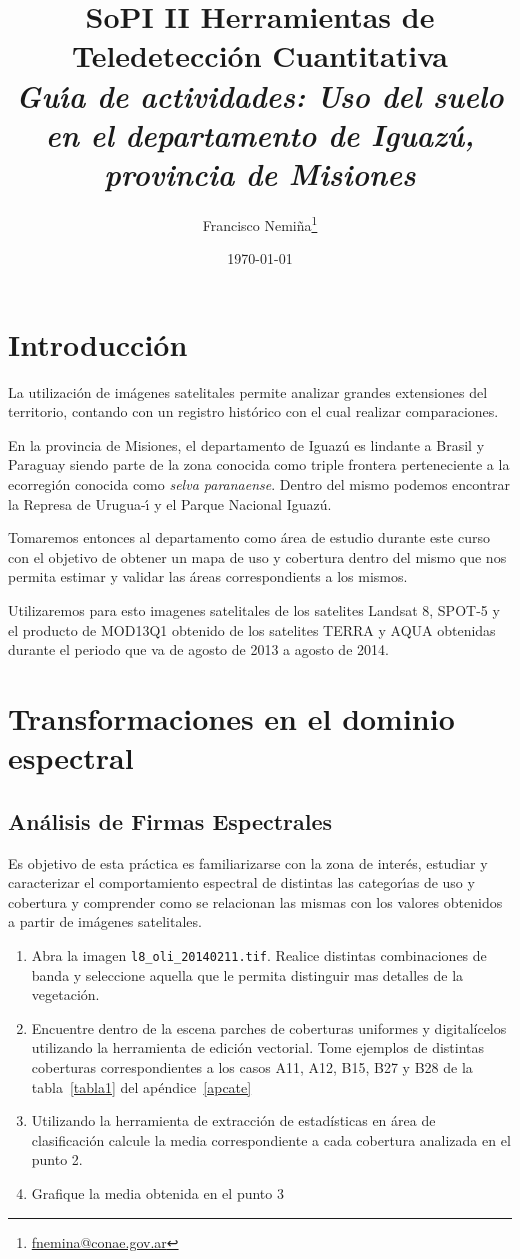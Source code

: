\documentclass[hidelinks,12pt]{article}
\title{SoPI II \- Herramientas de Teledetecci\'on Cuantitativa \\
\emph{Gu\'{\i}a de actividades: Uso del suelo en el departamento de Iguaz\'u,
provincia de Misiones}}
\author{Francisco
Nemi\~na\thanks{\href{mailto:fnemina@conae.govar}{fnemina@conae.gov.ar}}}
\affil{Unidad de Educaci\'on y Formaci\'on Masiva\\
    Comisi\'on Nacional de Actividades Espaciales}
\date{\today}
\begin{document}
\maketitle

\section*{Introducci\'on}

La utilización de imágenes satelitales permite analizar grandes extensiones del
territorio, contando con un registro histórico con el cual realizar
comparaciones.

En la provincia de Misiones, el departamento de Iguaz\'u es lindante a Brasil y
Paraguay siendo parte de la zona conocida como triple frontera
perteneciente a la ecorregi\'on conocida como \emph{selva paranaense}. Dentro
del mismo podemos encontrar la Represa de Urugua-\'{\i} y el Parque Nacional
Iguaz\'u.

Tomaremos entonces al departamento como \'area de estudio durante este curso
con el objetivo de obtener un mapa de uso y cobertura dentro del mismo que nos
permita estimar y validar  las \'areas correspondients a los mismos.

Utilizaremos para esto imagenes satelitales de los satelites Landsat 8, SPOT-5 y
el producto de MOD13Q1 obtenido de los satelites TERRA y AQUA obtenidas durante
el periodo que va de agosto de 2013 a agosto de 2014.

\newpage
\section{Transformaciones en el dominio espectral}
\subsection{Análisis de Firmas Espectrales}
Es objetivo de esta pr\'actica es familiarizarse con la zona de inter\'es,
estudiar y caracterizar el comportamiento espectral de distintas las
categor\'{\i}as de uso y cobertura y comprender como se relacionan las mismas
con los valores obtenidos a partir de im\'agenes  satelitales.

\begin{enumerate}
    \item Abra la imagen \texttt{l8\_oli\_20140211.tif}. Realice distintas
        combinaciones de banda y seleccione aquella que le permita distinguir
        mas detalles de la vegetación.
    \item Encuentre dentro de la escena parches de coberturas uniformes y
        digitalícelos utilizando la herramienta de edición vectorial. Tome
        ejemplos de distintas coberturas correspondientes a los casos A11, A12,
        B15, B27 y B28 de la tabla~\ref{tabla1} del ap\'endice~\ref{apcate}
    \item Utilizando la herramienta de extracción de estadísticas en \'area de
        clasificaci\'on calcule la media correspondiente a cada cobertura analizada
        en el punto 2.
    \item Grafique la media obtenida en el punto 3
\end{enumerate}
\end{document}
